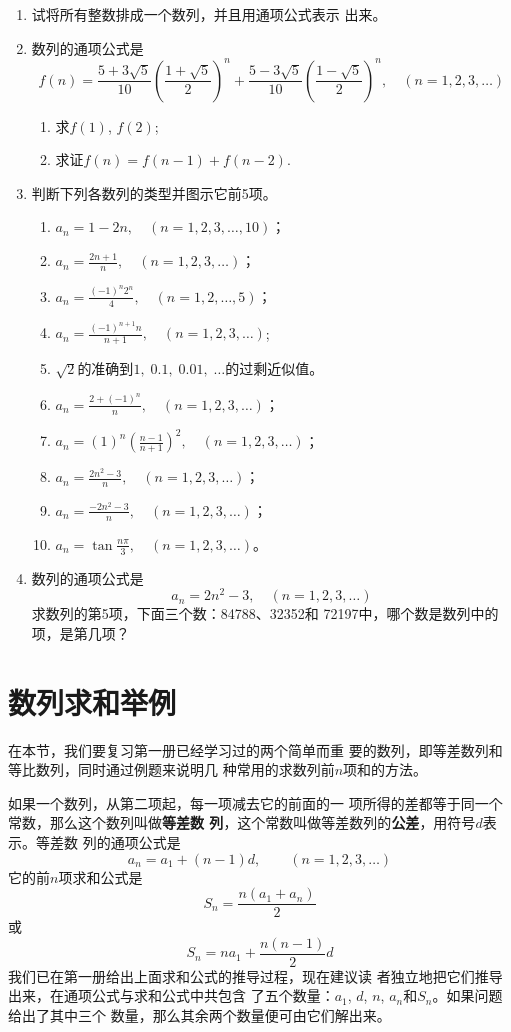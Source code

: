 \begin{enumerate}
\item 试将所有整数排成一个数列，并且用通项公式表示
出来。
\item 数列的通项公式是
\[f(n)=\frac{5+3\sqrt{5}}{10}\left(\frac{1+\sqrt{5}}{2}\right)^n+\frac{5-3\sqrt{5}}{10}\left(\frac{1-\sqrt{5}}{2}\right)^n,\quad (n=1,2,3,\ldots)\]
\begin{enumerate}
    \item 求$f(1)$, $f(2)$;
    \item 求证$f(n)=f(n-1)+f(n-2)$.
\end{enumerate}

\item 判断下列各数列的类型并图示它前5项。
\begin{enumerate}
    \item $a_n=1-2n,\quad (n=1,2,3,\ldots,10)$；
    \item $a_n=\frac{2n+1}{n},\quad (n=1,2,3,\ldots)$；
    \item $a_n=\frac{(-1)^n2^n}{4},\quad (n=1,2,\ldots,5)$；
    \item $a_n=\frac{(-1)^{n+1}n}{n+1},\quad (n=1,2,3,\ldots)$;
    \item $\sqrt{2}$的准确到$1,\; 0.1,\; 0.01,\; \ldots$的过剩近似值。
    \item $a_n=\frac{2+(-1)^n}{n},\quad (n=1,2,3,\ldots)$；
    \item $a_n=(1)^n\left(\frac{n-1}{n+1}\right)^2,\quad (n=1,2,3,\ldots)$；
    \item $a_n=\frac{2n^2-3}{n},\quad (n=1,2,3,\ldots)$；
    \item $a_n=\frac{-2n^2-3}{n},\quad (n=1,2,3,\ldots)$；
    \item $a_n=\tan \frac{n\pi}{3},\quad  (n=1,2,3,\ldots)$。
\end{enumerate}
\item 数列的通项公式是
\[a_n=2n^2-3,\quad (n=1,2,3,\ldots)\]
求数列的第5项，下面三个数：84788、32352和
72197中，哪个数是数列中的项，是第几项？
\end{enumerate}

\section{数列求和举例}
在本节，我们要复习第一册已经学习过的两个简单而重
要的数列，即等差数列和等比数列，同时通过例题来说明几
种常用的求数列前$n$项和的方法。

如果一个数列，从第二项起，每一项减去它的前面的一
项所得的差都等于同一个常数，那么这个数列叫做\textbf{等差数
列}，这个常数叫做等差数列的\textbf{公差}，用符号$d$表示。等差数
列的通项公式是
\[a_n=a_1+(n-1)d,\qquad (n=1,2,3,\ldots)\]
它的前$n$项求和公式是
\[S_n=\frac{n(a_1+a_n)}{2}\]
或
\[S_n=na_1+\frac{n(n-1)}{2}d\]
我们已在第一册给出上面求和公式的推导过程，现在建议读
者独立地把它们推导出来，在通项公式与求和公式中共包含
了五个数量：$a_1$, $d$, $n$, $a_n$和$S_n$。如果问题给出了其中三个
数量，那么其余两个数量便可由它们解出来。

